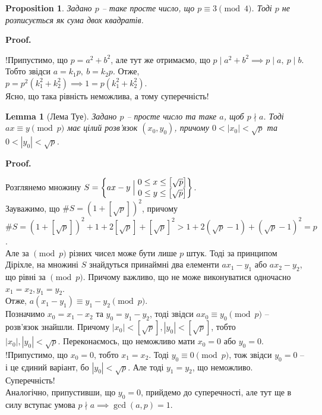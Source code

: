 \documentclass[a4paper, 10pt]{article}
\makeatletter
\theoremstyle{theoremdd}
\theoremstyle{theoremdd}
\theoremstyle{theoremdd}
\theoremstyle{theoremdd}
\theoremstyle{theoremdd}
\newtheorem{proposition}[theorem]{Proposition}
\theoremstyle{theoremdd}
\theoremstyle{theoremdd}
\newtheorem{lemma}[theorem]{Lemma}
\theoremstyle{theoremdd}
\renewenvironment{proof}[1][Proof.\\]{\par
\pushQED{\hfill \qed}%
\normalfont \topsep6\p@\@plus6\p@\relax
\trivlist
\item\relax
{\bfseries
#1\@addpunct{.}}\hspace\labelsep\ignorespaces
}{%
\popQED\endtrivlist\@endpefalse
}
\makeatother
\begin{document}
\begin{proposition}
\label{p equiv 3 mod 4 implies no sum of two squares}
Задано $p$ -- таке просте число, що $p \equiv 3 \pmod 4$. Тоді $p$ не розписується як сума двох квадратів.
\end{proposition}

\begin{proof}
!Припустимо, що $p = a^2+b^2$, але тут же отримаємо, що $p \mid a^2+b^2 \implies p \mid a,\ p \mid b$. Тобто звідси $a = k_1p,\ b = k_2p$. Отже, \\
$p = p^2(k_1^2+k_2^2) \implies 1 = p(k_1^2+k_2^2)$. \\
Ясно, що така рівність неможлива, а тому суперечність!
\end{proof}

\begin{lemma}[Лема Туе]
Задано $p$ -- просте число та таке $a$, щоб $p \nmid a$. Тоді $ax \equiv y \pmod p$ має цілий розв'язок $(x_0,y_0)$, причому $0 < |x_0| < \sqrt{p}$ та $0 < |y_0| < \sqrt{p}$.
\end{lemma}

\begin{proof}
Розглянемо множину $S = \left\{ax-y \Bigm| \substack{\textstyle 0 \leq x \leq \left[\sqrt{p}\right] \\ \textstyle  0 \leq y \leq \left[\sqrt{p}\right]}\right\}$. \\ Зауважимо, що $\# S = (1+\left[\sqrt{p}\right])^2$, причому\\
$\# S = (1 + \left[\sqrt{p}\right])^2  + 1 + 2 \left[\sqrt{p}\right] + \left[\sqrt{p}\right]^2 > 1 + 2 (\sqrt{p}-1) + (\sqrt{p}-1)^2 = p$.\\
Але за $\!\! \pmod p$ різних чисел може бути лише $p$ штук. Тоді за принципом Діріхле, на множині $S$ знайдуться принаймні два елементи $ax_1-y_1$ або $ax_2-y_2$, що рівні за $\!\! \pmod p$. Причому важливо, що не може виконуватися одночасно $x_1 = x_2, y_1 = y_2$.\\
Отже, $a(x_1-y_1) \equiv y_1-y_2 \pmod p$.\\
Позначимо $x_0 = x_1-x_2$ та $y_0 = y_1-y_2$, тоді звідси $ax_0 \equiv y_0 \pmod p$ -- розв'язок знайшли. Причому $|x_0| < [\sqrt{p}], |y_0| < [\sqrt{p}]$, тобто\\
$|x_0|,|y_0| < \sqrt{p}$. Переконаємось, що неможливо мати $x_0 = 0$ або $y_0 = 0$.\\
!Припустимо, що $x_0 = 0$, тобто $x_1 = x_2$. Тоді $y_0 \equiv 0 \pmod p$, тож звідси $y_0 = 0$ -- і це єдиний варіант, бо $|y_0| < \sqrt{p}$. Але тоді $y_1 = y_2$, що неможливо. Суперечність!\\
Аналогічно, припустивши, що $y_0 = 0$, прийдемо до суперечності, але тут ще в силу вступає умова $p \nmid a \implies \gcd(a,p) = 1$.
\end{proof}
\end{document}
